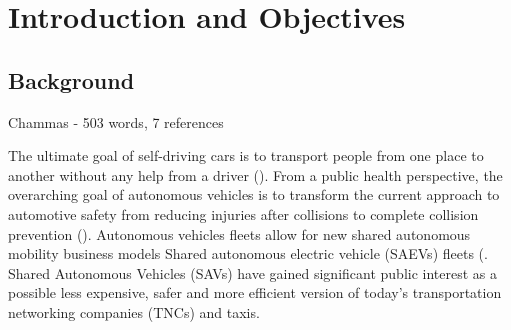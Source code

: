 
\chapter{Introduction and Objectives}

\label{Intro} 



\section{Background}

Chammas - 503 words, 7 references



 The ultimate goal of self-driving cars is to transport people from one place to another without any help from a driver (\cite{s20092544}).
 From a public health perspective, the overarching
goal of autonomous vehicles is to
transform the current approach
to automotive safety from reducing injuries after collisions to
 complete collision prevention (\cite{Fleetwood_2017}).
Autonomous vehicles fleets allow for new shared autonomous mobility business models 
\cite{riggs2019business}
Shared autonomous electric vehicle (SAEVs) fleets (\cite{loeb2019fleet}. Shared Autonomous Vehicles (SAVs) have gained significant public interest as a possible less expensive, safer and more efficient version of today’s transportation networking companies (TNCs) and taxis.

